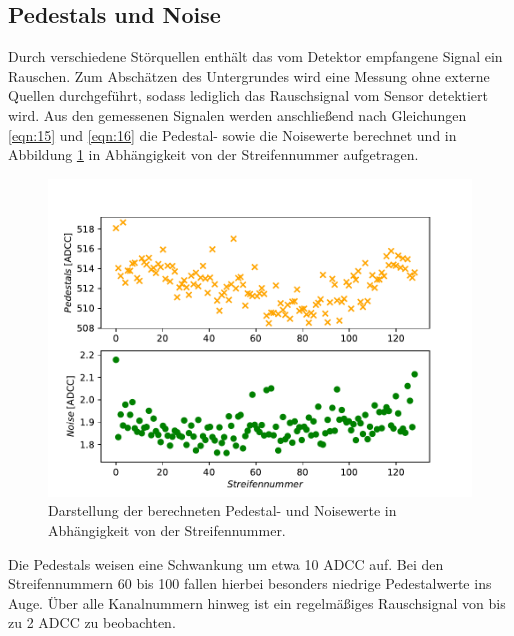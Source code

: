 \subsection{Pedestals und Noise}
\label{kap:Pedestal}
Durch verschiedene Störquellen enthält das vom Detektor empfangene Signal ein Rauschen. Zum Abschätzen des Untergrundes wird eine Messung ohne externe Quellen durchgeführt, sodass lediglich das Rauschsignal vom Sensor detektiert wird. Aus den gemessenen Signalen werden anschließend nach Gleichungen \eqref{eqn:15} und \eqref{eqn:16} die Pedestal- sowie die Noisewerte berechnet und in Abbildung \ref{fig:Pedestals} in Abhängigkeit von der Streifennummer aufgetragen.
\begin{figure}
  \centering
  \includegraphics[width=\textwidth]{plots/Pedestals_Noise.pdf}
  \caption{Darstellung der berechneten Pedestal- und Noisewerte in Abhängigkeit von der Streifennummer.}
  \label{fig:Pedestals}
\end{figure}
\FloatBarrier
Die Pedestals weisen eine Schwankung um etwa 10 ADCC auf. Bei den Streifennummern 60 bis 100 fallen hierbei besonders niedrige Pedestalwerte ins Auge.
Über alle Kanalnummern hinweg ist ein regelmäßiges Rauschsignal von bis zu 2 ADCC zu beobachten.

